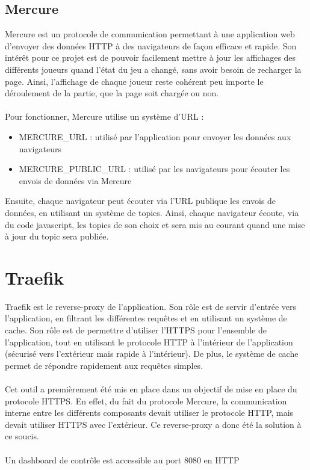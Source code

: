 \documentclass{article}
\begin{document}
        \subsection{Mercure}

            Mercure est un protocole de communication permettant à une application web d'envoyer des données HTTP à des navigateurs de façon efficace et rapide. Son intérêt pour ce projet est de pouvoir facilement mettre à jour les affichages des différents joueurs quand l'état du jeu a changé, sans avoir besoin de recharger la page. Ainsi, l'affichage de chaque joueur reste cohérent peu importe le déroulement de la partie, que la page soit chargée ou non.\\
            \\
            \indent Pour fonctionner, Mercure utilise un système d'URL : 
            \begin{itemize}
                \item MERCURE\_URL : utilisé par l'application pour envoyer les données aux navigateurs
                \item MERCURE\_PUBLIC\_URL : utilisé par les navigateurs pour écouter les envois de données via Mercure
            \end{itemize}
            Ensuite, chaque navigateur peut écouter via l'URL publique les envois de données, en utilisant un système de topics. Ainsi, chaque navigateur écoute, via du code javascript, les topics de son choix et sera mis au courant quand une mise à jour du topic sera publiée.
        
    \section{Traefik}

        Traefik est le reverse-proxy de l'application. Son rôle est de servir d'entrée vers l'application, en filtrant les différentes requêtes et en utilisant un système de cache. Son rôle est de permettre d'utiliser l'HTTPS pour l'ensemble de l'application, tout en utilisant le protocole HTTP à l'intérieur de l'application (sécurisé vers l'extérieur mais rapide à l'intérieur). De plus, le système de cache permet de répondre rapidement aux requêtes simples.\\
        \\
        \indent Cet outil a premièrement été mis en place dans un objectif de mise en place du protocole HTTPS. En effet, du fait du protocole Mercure, la communication interne entre les différents composants devait utiliser le protocole HTTP, mais devait utiliser HTTPS avec l'extérieur. Ce reverse-proxy a donc été la solution à ce soucis.\\
        \\
        Un dashboard de contrôle est accessible au port 8080 en HTTP
\end{document}
